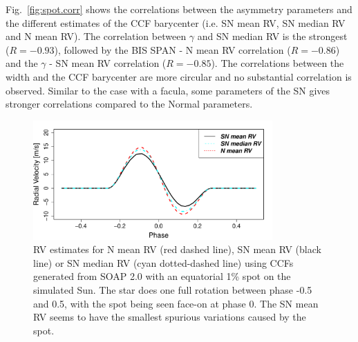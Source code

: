 \documentclass{aa}
\begin{document}
Fig.~\ref{fig:spot.corr} shows the correlations between the asymmetry parameters and the different estimates of the CCF barycenter (i.e. SN mean RV, SN median RV and N mean RV). The correlation between $\gamma$ and SN median RV is the strongest ($R=-0.93$), followed by the BIS SPAN - N mean RV correlation ($R=-0.86$) and the $\gamma$ - SN mean RV correlation ($R=-0.85$). 
The correlations between the width and the CCF barycenter are more circular and no substantial correlation is observed. 
Similar to the case with a facula, some parameters of the SN gives stronger correlations compared to the Normal parameters.

\begin{figure}[htbp]
\begin{center}
\includegraphics[width=3.6in]{RV_comparison_SPOT.pdf} 
\caption{RV estimates for N mean RV (red dashed line),  SN mean RV (black line) or SN median RV (cyan dotted-dashed line) using CCFs generated from SOAP 2.0 with an equatorial 1\% spot on the simulated Sun. The star does one full rotation between phase -0.5 and 0.5, with the spot being seen face-on at phase 0. The SN mean RV seems to have the smallest spurious variations caused by the spot.}
    \label{fig:spot}
\end{center}
\end{figure}
\end{document}
